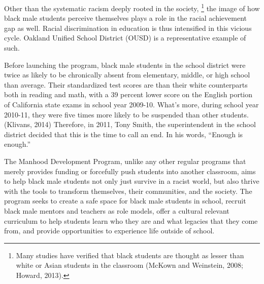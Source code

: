 Other than the systematic racism deeply rooted in the society, \footnote{Many studies have verified that black students are thought as lesser than white or Asian students in the classroom (McKown and Weinstein, 2008; Howard, 2013).} the image of how black male students perceive themselves plays a role in the racial achievement gap as well. Racial discrimination in education is thus intensified in this vicious cycle. Oakland Unified School District (OUSD) is a representative example of such. 

Before launching the program, black male students in the school district were twice as likely to be chronically absent from elementary, middle, or high school than average. Their standardized test scores are than their white counterparts both in reading and math, with a 39 percent lower score on the English portion of California state exams in school year 2009-10. What’s more, during school year 2010-11, they were five times more likely to be suspended than other students. (Klivans, 2014) Therefore, in 2011, Tony Smith, the superintendent in the school district decided that this is the time to call an end. In his words, “Enough is enough.” 

The Manhood Development Program, unlike any other regular programs that merely provides funding or forcefully push students into another classroom, aims to help black male students not only just survive in a racist world, but also thrive with the tools to transform themselves, their communities, and the society. The program seeks to create a safe space for black male students in school, recruit black male mentors and teachers as role models, offer a cultural relevant curriculum to help students learn who they are and what legacies that they come from, and provide opportunities to experience life outside of school.

